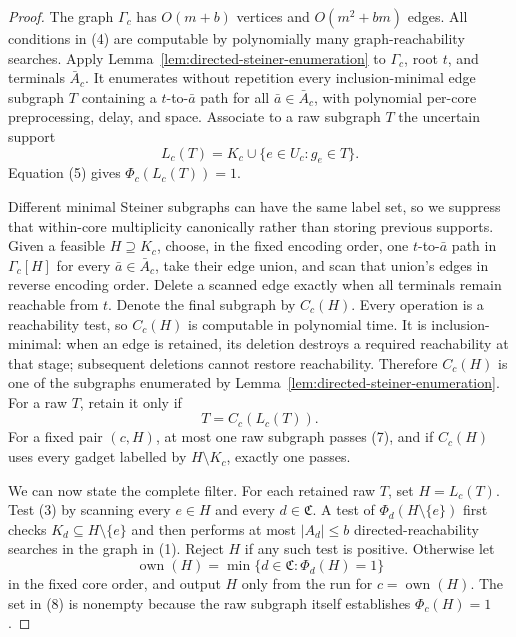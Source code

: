 \documentclass{article}
\begin{document}
\begin{proof}
The graph \(\Gamma_c\) has \(O(m+b)\) vertices and \(O(m^2+bm)\) edges.  All conditions in (4) are computable by polynomially many graph-reachability searches.  Apply Lemma~\ref{lem:directed-steiner-enumeration} to \(\Gamma_c\), root \(t\), and terminals \(\bar A_c\).  It enumerates without repetition every inclusion-minimal edge subgraph \(T\) containing a \(t\)-to-\(\bar a\) path for all \(\bar a\in\bar A_c\), with polynomial per-core preprocessing, delay, and space.  Associate to a raw subgraph \(T\) the uncertain support
\[
 L_c(T)=K_c\cup\{e\in U_c:g_e\in T\}.
 \tag{6}
\]
Equation (5) gives \(\Phi_c(L_c(T))=1\).

Different minimal Steiner subgraphs can have the same label set, so we suppress that within-core multiplicity canonically rather than storing previous supports.  Given a feasible \(H\supseteq K_c\), choose, in the fixed encoding order, one \(t\)-to-\(\bar a\) path in \(\Gamma_c[H]\) for every \(\bar a\in\bar A_c\), take their edge union, and scan that union's edges in reverse encoding order.  Delete a scanned edge exactly when all terminals remain reachable from \(t\).  Denote the final subgraph by \(C_c(H)\).  Every operation is a reachability test, so \(C_c(H)\) is computable in polynomial time.  It is inclusion-minimal: when an edge is retained, its deletion destroys a required reachability at that stage; subsequent deletions cannot restore reachability.  Therefore \(C_c(H)\) is one of the subgraphs enumerated by Lemma~\ref{lem:directed-steiner-enumeration}.  For a raw \(T\), retain it only if
\[
 T=C_c(L_c(T)).
 \tag{7}
\]
For a fixed pair \((c,H)\), at most one raw subgraph passes (7), and if \(C_c(H)\) uses every gadget labelled by \(H\setminus K_c\), exactly one passes.

We can now state the complete filter.  For each retained raw \(T\), set \(H=L_c(T)\).  Test (3) by scanning every \(e\in H\) and every \(d\in\mathfrak C\).  A test of \(\Phi_d(H\setminus\{e\})\) first checks \(K_d\subseteq H\setminus\{e\}\) and then performs at most \(|A_d|\le b\) directed-reachability searches in the graph in (1).  Reject \(H\) if any such test is positive.  Otherwise let
\[
 \operatorname{own}(H)=\min\{d\in\mathfrak C:\Phi_d(H)=1\}
 \tag{8}
\]
in the fixed core order, and output \(H\) only from the run for \(c=\operatorname{own}(H)\).  The set in (8) is nonempty because the raw subgraph itself establishes \(\Phi_c(H)=1\).


\end{proof}
\end{document}
